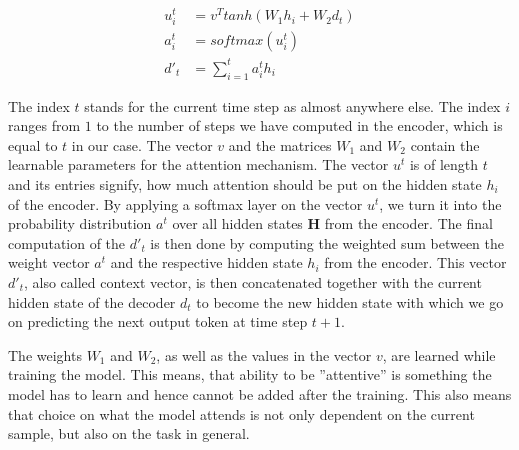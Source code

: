 \begin{equation}
\label{fundamentals:attention:equations}
\begin{split}
	u^t_i & = v^T tanh(W_1 h_i + W_2 d_t) \\
	a^t_i & = softmax(u^t_i) \\
	d'_t & = \sum_{i=1}^{t} a^t_i h_i
\end{split}
\end{equation}

The index $t$ stands for the current time step as almost anywhere else. The index $i$ ranges from $1$ to the number of steps we have computed in the encoder, which is equal to $t$ in our case. The vector $v$ and the matrices $W_1$ and $W_2$ contain the learnable parameters for the attention mechanism. The vector $u^t$ is of length $t$ and its entries signify, how much attention should be put on the hidden state $h_i$ of the encoder. By applying a softmax layer on the vector $u^t$, we turn it into the probability distribution $a^t$ over all hidden states $\mathbf{H}$ from the encoder. The final computation of the $d'_t$ is then done by computing the weighted sum between the weight vector $a^t$ and the respective hidden state $h_i$ from the encoder. This vector $d'_t$, also called context vector, is then concatenated together with the current hidden state of the decoder $d_t$ to become the new hidden state with which we go on predicting the next output token at time step $t+1$.

The weights $W_1$ and $W_2$, as well as the values in the vector $v$, are learned while training the model. This means, that ability to be ''attentive'' is something the model has to learn and hence cannot be added after the training. This also means that choice on what the model attends is not only dependent on the current sample, but also on the task in general.

